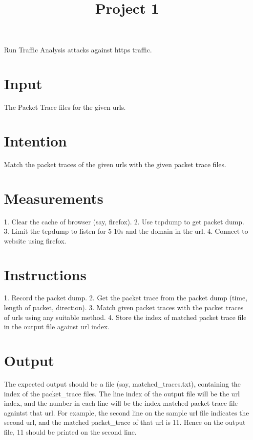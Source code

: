 \documentclass{handout}
\begin{document}
\title{Project 1}


\maketitle
\makeindex
 Run Traffic Analysis attacks against https traffic.

\section{Input}

 The Packet Trace files for the given urls.

\section{Intention}

 Match the packet traces of the given urls with the given packet trace files.

\section{Measurements}

 1. Clear the cache of browser (say, firefox).
 2. Use tcpdump to get packet dump.
 3. Limit the tcpdump to listen for 5-10s and the domain in the url.
 4. Connect to website using firefox.

\section{Instructions}

 1. Record the packet dump.
 2. Get the packet trace from the packet dump (time, length of packet, direction).
 3. Match given packet traces with the packet traces of urls using any suitable method.
 4. Store the index of matched packet trace file in the output file against url index.

\section{Output}

 The expected output should be a file (say, matched_traces.txt), containing the index of the packet_trace files. The line index of the output file will be the url index, and the number in each line will be the index matched packet trace file againtst that url.
 For example, the second line on the sample url file indicates the second url, and the matched packet_trace of that url is 11. Hence on the output file, 11 should be printed on the second line.

\printindex
\end{document}
